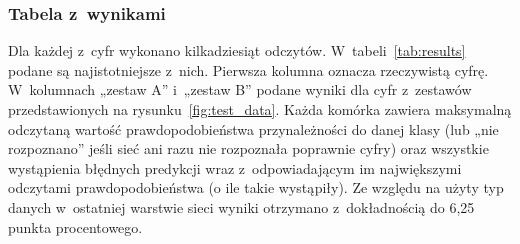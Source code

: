\documentclass[12pt, oneside, a4paper]{article}
\begin{document}
\subsubsection{Tabela z~wynikami}\label{sec:Tabela z~wynikami}
Dla każdej z~cyfr wykonano kilkadziesiąt odczytów. W~tabeli~\ref{tab:results}
podane są najistotniejsze z~nich.
Pierwsza kolumna oznacza rzeczywistą cyfrę. W~kolumnach „zestaw A” i~„zestaw B”
podane wyniki dla cyfr z~zestawów przedstawionych
na rysunku~\ref{fig:test_data}.
Każda komórka zawiera maksymalną odczytaną wartość prawdopodobieństwa
przynależności do danej klasy (lub „nie rozpoznano” jeśli sieć ani razu
nie rozpoznała poprawnie cyfry)
oraz wszystkie wystąpienia błędnych predykcji wraz z~odpowiadającym im
największymi odczytami prawdopodobieństwa (o ile takie wystąpiły).
Ze względu na użyty typ danych w~ostatniej warstwie sieci
wyniki otrzymano z~dokładnością do 6,25 punkta procentowego.
\end{document}
